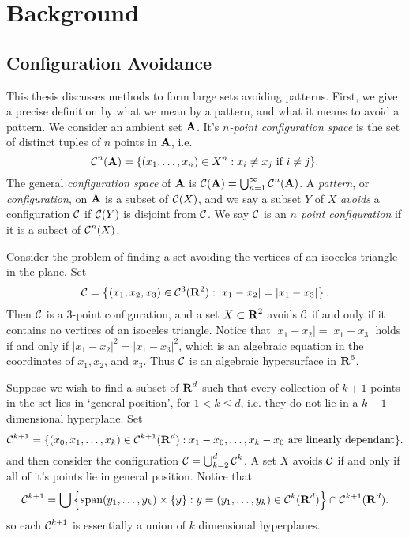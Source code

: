 
\chapter{Background}
\label{ch:Background}

\section{Configuration Avoidance}

This thesis discusses methods to form large sets avoiding patterns. First, we give a precise definition by what we mean by a pattern, and what it means to avoid a pattern. We consider an ambient set $\operatorname{\mathbf{A}}$. It's \emph{$n$-point configuration space} is the set of distinct tuples of $n$ points in $\operatorname{\mathbf{A}}$, i.e.
%
\[ \operatorname{\mathcal{C}}^n(\operatorname{\mathbf{A}}) = \{ (x_1, \dots, x_n) \in X^n: x_i \neq x_j\ \text{if $i \neq j$} \}. \]
%
The general \emph{configuration space} of $\operatorname{\mathbf{A}}$ is $\operatorname{\mathcal{C}}(\operatorname{\mathbf{A}}) = \bigcup_{n = 1}^\infty \operatorname{\mathcal{C}}^n(\operatorname{\mathbf{A}})$. A \emph{pattern}, or \emph{configuration}, on $\operatorname{\mathbf{A}}$ is a subset of $\operatorname{\mathcal{C}}(X)$, and we say a subset $Y$ of $X$ \emph{avoids} a configuration $\operatorname{\mathcal{C}}$ if $\operatorname{\mathcal{C}}(Y)$ is disjoint from $\operatorname{\mathcal{C}}$. We say $\operatorname{\mathcal{C}}$ is an \emph{$n$ point configuration} if it is a subset of $\operatorname{\mathcal{C}}^n(X)$.

\begin{example}
	Consider the problem of finding a set avoiding the vertices of an isoceles triangle in the plane. Set
	\[ \operatorname{\mathcal{C}} = \left\{ (x_1, x_2, x_3) \in \operatorname{\mathcal{C}}^3(\operatorname{\mathbf{R}}^2) : |x_1-x_2| = |x_1-x_3| \right\}. \]
	Then $\operatorname{\mathcal{C}}$ is a 3-point configuration, and a set $X \subset \operatorname{\mathbf{R}}^2$ avoids $\operatorname{\mathcal{C}}$ if and only if it contains no vertices of an isoceles triangle. Notice that $|x_1 - x_2| = |x_1 - x_3|$ holds if and only if $|x_1 - x_2|^2 = |x_1 - x_3|^2$, which is an algebraic equation in the coordinates of $x_1,x_2$, and $x_3$. Thus $\operatorname{\mathcal{C}}$ is an algebraic hypersurface in $\operatorname{\mathbf{R}}^6$.
\end{example}

\begin{example}
	Suppose we wish to find a subset of $\operatorname{\mathbf{R}}^d$ such that every collection of $k+1$ points in the set lies in `general position', for $1 < k \leq d$, i.e. they do not lie in a $k-1$ dimensional hyperplane. Set
	\[ \operatorname{\mathcal{C}}^{k+1} = \{ (x_0, x_1, \dots, x_k) \in \operatorname{\mathcal{C}}^{k+1}(\operatorname{\mathbf{R}}^d): x_1-x_0, \dots, x_k - x_0\ \text{are linearly dependant} \}. \]
	and then consider the configuration $\operatorname{\mathcal{C}} = \bigcup_{k = 2}^d \operatorname{\mathcal{C}}^k$. A set $X$ avoids $\operatorname{\mathcal{C}}$ if and only if all of it's points lie in general position. Notice that
	\[ \operatorname{\mathcal{C}}^{k+1} = \bigcup \left\{ \text{span}(y_1, \dots, y_k) \times \{ y \} : y = (y_1, \dots, y_k) \in \operatorname{\mathcal{C}}^k(\operatorname{\mathbf{R}}^d) \right\} \cap \operatorname{\mathcal{C}}^{k+1}(\operatorname{\mathbf{R}}^d). \]
	so each $\operatorname{\mathcal{C}}^{k+1}$ is essentially a union of $k$ dimensional hyperplanes.
\end{example}

